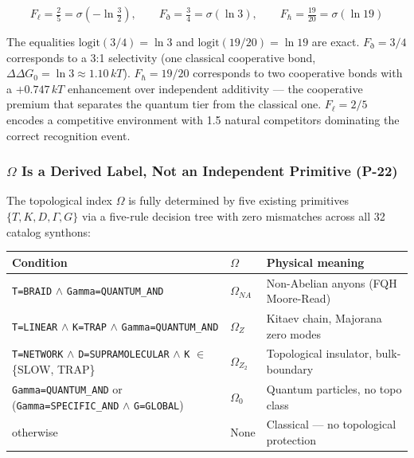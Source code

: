 \documentclass[12pt,a4paper]{article}
\begin{document}
\[F_\ell = \tfrac{2}{5} = \sigma\!\left(-\ln\tfrac{3}{2}\right), \qquad F_\eth = \tfrac{3}{4} = \sigma(\ln 3), \qquad F_\hbar = \tfrac{19}{20} = \sigma(\ln 19)\]

The equalities $\text{logit}(3/4) = \ln 3$ and $\text{logit}(19/20) = \ln 19$ are exact. $F_\eth = 3/4$ corresponds to a 3:1 selectivity (one classical cooperative bond, $\Delta\Delta G_0 = \ln 3 \approx 1.10\,kT$). $F_\hbar = 19/20$ corresponds to two cooperative bonds with a $+0.747\,kT$ enhancement over independent additivity --- the cooperative premium that separates the quantum tier from the classical one. $F_\ell = 2/5$ encodes a competitive environment with 1.5 natural competitors dominating the correct recognition event.

\subsubsection{$\Omega$ Is a Derived Label, Not an Independent Primitive (P-22)}

The topological index $\Omega$ is fully determined by five existing primitives $\{T, K, D, \Gamma, G\}$ via a five-rule decision tree with zero mismatches across all 32 catalog synthons:

\begin{table}[htbp]
\centering
\small
{}
\begin{tabularx}{\textwidth}{>{\centering\arraybackslash}X >{\centering\arraybackslash}X >{\centering\arraybackslash}X}
\toprule
\rowcolor{gray!25}\textbf{Condition} & \textbf{$\Omega$} & \textbf{Physical meaning} \\
\midrule
\rowcolors{1}{white}{gray!10}
\texttt{T=BRAID} $\land$ \texttt{Gamma=QUANTUM\_AND} & $\Omega_{NA}$ & Non-Abelian anyons (FQH Moore-Read) \\
\texttt{T=LINEAR} $\land$ \texttt{K=TRAP} $\land$ \texttt{Gamma=QUANTUM\_AND} & $\Omega_Z$ & Kitaev chain, Majorana zero modes \\
\texttt{T=NETWORK} $\land$ \texttt{D=SUPRAMOLECULAR} $\land$ \texttt{K} $\in$ \{SLOW, TRAP\} & $\Omega_{Z_2}$ & Topological insulator, bulk-boundary \\
\texttt{Gamma=QUANTUM\_AND} or (\texttt{Gamma=SPECIFIC\_AND} $\land$ \texttt{G=GLOBAL}) & $\Omega_0$ & Quantum particles, no topo class \\
otherwise & None & Classical --- no topological protection \\
\bottomrule
\end{tabularx}
\end{table}
\end{document}
